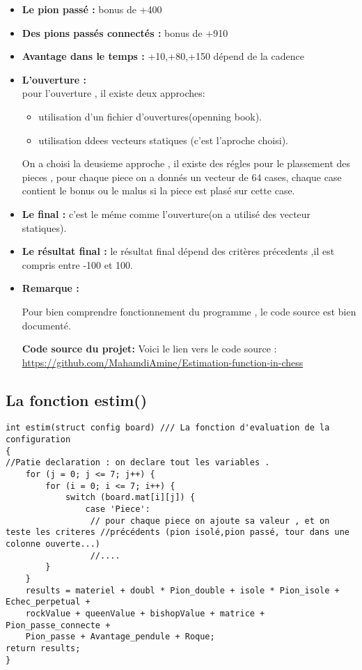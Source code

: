 \documentclass[12pt]{report}
\begin{document}
\begin{itemize}
	\item \textbf{Le pion passé :} bonus de +400\\
	\item \textbf{Des pions passés connectés :} bonus de +910 \\
	\item \textbf{Avantage dans le temps :} {+10,+80,+150} dépend de la cadence\\
	\item \textbf{L'ouverture :} \\
	pour l'ouverture , il existe deux approches:
	\begin{itemize}
		\item utilisation d'un fichier d'ouvertures(openning book).
		\item utilisation ddees vecteurs statiques (c'est l'aproche choisi).
	\end{itemize}
	On a choisi la deusieme approche , il existe des régles pour le plassement des pieces , pour chaque piece on a donnés un vecteur de 64 cases, chaque case contient le bonus ou le malus si la piece est plasé sur cette case.
	\item \textbf{Le final :} c'est le méme comme l'ouverture(on a utilisé des vecteur statiques). \\  
	\item \textbf{Le résultat final :} le résultat final dépend des critères précedents ,il est compris entre -100 et 100.
	 \item \textbf{Remarque :} 
	\par{}
	Pour bien comprendre fonctionnement du programme  , le code source est bien documenté.
	\par{}
	\textbf{Code source du projet: } 
	\newline
	Voici  le lien vers le code source :
	\newline
	\href{https://github.com/MahamdiAmine/Estimation-function-in-chess}{https://github.com/MahamdiAmine/Estimation-function-in-chess}
\end{itemize}
\subsection{La fonction estim()}
\lstset{language=C}
\lstset{basicstyle=\footnotesize}
\begin{lstlisting}
int estim(struct config board) /// La fonction d'evaluation de la configuration
{
//Patie declaration : on declare tout les variables .
	for (j = 0; j <= 7; j++) {
		for (i = 0; i <= 7; i++) {
			switch (board.mat[i][j]) {
				case 'Piece':
				 // pour chaque piece on ajoute sa valeur , et on teste les criteres //précédents (pion isolé,pion passé, tour dans une colonne ouverte...)
				 //....   
		}
	}
	results = materiel + doubl * Pion_double + isole * Pion_isole + Echec_perpetual +
	rockValue + queenValue + bishopValue + matrice + Pion_passe_connecte +
	Pion_passe + Avantage_pendule + Roque;
return results;		
}
\end{lstlisting}
	
\end{document}
